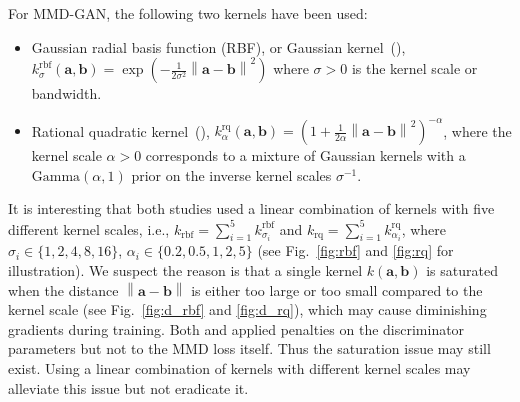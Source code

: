 \documentclass{article} %
\theoremstyle{plain}
\newtheorem*{proposition 1*}{Proposition 1}
\newcommand\norm[1]{\left\lVert#1\right\rVert}
\begin{document}
For MMD-GAN, the following two kernels have been used:
\begin{itemize}[leftmargin=*]
	\item Gaussian radial basis function (RBF), or Gaussian kernel~(\cite{mmd_gan_g}), \(k_{\sigma}^{\text{rbf}}(\bm{a},\bm{b})=\exp(-\frac{1}{2\sigma^2}\norm{\bm{a}-\bm{b}}^2)\) where \(\sigma>0\) is the kernel scale or bandwidth. 
	\item Rational quadratic kernel~(\cite{mmd_gan_t}), \(k_{\alpha}^{\text{rq}}(\bm{a},\bm{b})=(1+\frac{1}{2\alpha}\norm{\bm{a}-\bm{b}}^2)^{-\alpha}\), where the kernel scale \(\alpha>0\) corresponds to a mixture of Gaussian kernels with a \(\text{Gamma}(\alpha,1)\) prior on the inverse kernel scales \(\sigma^{-1}\).
\end{itemize}
It is interesting that both studies used a linear combination of kernels with five different kernel scales, i.e., \(k_{\text{rbf}}=\sum_{i=1}^5k_{\sigma_{i}}^{\text{rbf}}\) and \(k_{\text{rq}}=\sum_{i=1}^5k_{\alpha_{i}}^{\text{rq}}\), where \(\sigma_{i}\in\{1,2,4,8,16\}\), \(\alpha_{i}\in\{0.2,0.5,1,2,5\}\) (see Fig.~\ref{fig:rbf} and \ref{fig:rq} for illustration). We suspect the reason is that a single kernel \(k(\bm{a},\bm{b})\) is saturated when the distance \(\norm{\bm{a}-\bm{b}}\) is either too large or too small compared to the kernel scale (see Fig.~\ref{fig:d_rbf} and \ref{fig:d_rq}), which may cause diminishing gradients during training. Both \cite{mmd_gan_g} and \cite{mmd_gan_t} applied penalties on the discriminator parameters but not to the MMD loss itself. Thus the saturation issue may still exist. Using a linear combination of kernels with different kernel scales may alleviate this issue but not eradicate it.
\end{document}
